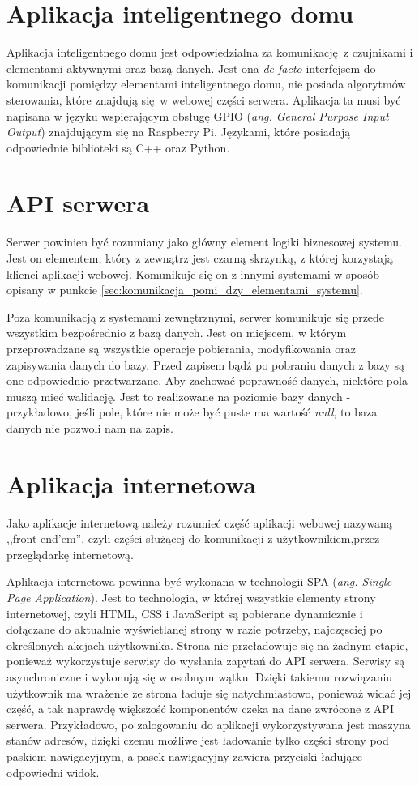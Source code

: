 \documentclass[eng,oneside]{mgr}
\begin{document}
\section{Aplikacja inteligentnego domu} %
\label{sec:specyfikacja_aplikacja_inteligentnego_domu}
Aplikacja inteligentnego domu jest odpowiedzialna za komunikację z czujnikami i elementami aktywnymi oraz bazą danych. Jest ona \emph{de facto} interfejsem do komunikacji pomiędzy elementami inteligentnego domu, nie posiada algorytmów sterowania, które znajdują się w webowej części serwera.
Aplikacja ta musi być napisana w języku wspierającym obsługę GPIO (\emph{ang. General Purpose Input Output}) znajdującym się na Raspberry Pi. Językami, które posiadają odpowiednie biblioteki są C++ oraz Python.

\section{API serwera}
Serwer powinien być rozumiany jako główny element logiki biznesowej systemu. Jest on elementem, który z zewnątrz jest czarną skrzynką, z której korzystają klienci aplikacji webowej. Komunikuje się on z innymi systemami w sposób opisany w punkcie \ref{sec:komunikacja_pomi_dzy_elementami_systemu}.

Poza komunikacją z systemami zewnętrznymi, serwer komunikuje się przede wszystkim bezpośrednio z bazą danych. Jest on miejscem, w którym przeprowadzane są wszystkie operacje pobierania, modyfikowania oraz zapisywania danych do bazy. Przed zapisem bądź po pobraniu danych z bazy są one odpowiednio przetwarzane. Aby zachować poprawność danych, niektóre pola muszą mieć walidację. Jest to realizowane na poziomie bazy danych - przykładowo, jeśli pole, które nie może być puste ma wartość \emph{null}, to baza danych nie pozwoli nam na zapis.

\section{Aplikacja internetowa}
Jako aplikacje internetową należy rozumieć część aplikacji webowej nazywaną ,,front-end’em'', czyli części służącej do komunikacji z użytkownikiem,przez przeglądarkę internetową.

Aplikacja internetowa powinna być wykonana w technologii SPA (\emph{ang. Single Page Application}). Jest to technologia, w której wszystkie elementy strony internetowej, czyli HTML, CSS i JavaScript są pobierane dynamicznie i dołączane do aktualnie wyświetlanej strony w razie potrzeby, najczęsciej po określonych akcjach użytkownika. Strona nie przeładowuje się na żadnym etapie, ponieważ wykorzystuje serwisy do wysłania zapytań do API serwera. Serwisy są asynchroniczne i wykonują się w osobnym wątku. Dzięki takiemu rozwiązaniu użytkownik ma wrażenie ze strona ładuje się natychmiastowo, ponieważ widać jej część, a tak naprawdę większość komponentów czeka na dane zwrócone z API serwera. Przykładowo, po zalogowaniu do aplikacji wykorzystywana jest maszyna stanów adresów, dzięki czemu możliwe jest ładowanie tylko części strony pod paskiem nawigacyjnym, a pasek nawigacyjny zawiera przyciski ładujące odpowiedni widok.
\end{document}
